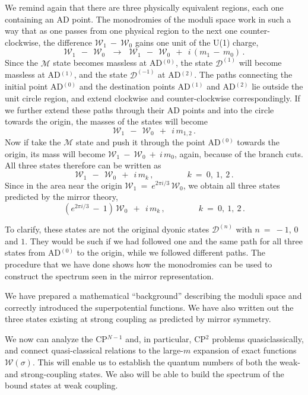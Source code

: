 \documentclass[epsfig,12pt]{article}
\def\beq{\begin{equation}}
\def\eeq{\end{equation}}
\def\beq{\begin{equation}}
\def\eeq{\end{equation}}
\newcommand{\W}{\mathcal{W}}
\newcommand{\M}{\mathcal{M}}
\newcommand{\D}{\mathcal{D}}
\begin{document}
	We remind again that there are three physically equivalent regions, each one containing an AD point.
	The monodromies of the moduli space work in such a way that as one passes from 
	one physical region to the next one counter-clockwise, the difference 
$ \W_1 ~-~ \W_0 $
	gains one unit of the U(1) charge,
\beq
	\W_1 ~~-~~ \W_0  ~~~\to~~~ \W_1 ~~-~~ \W_0 ~~+~~ i\,( m_1 \,-\, m_0 ) \,.
\eeq
	Since the $ \M $ state becomes massless at AD$^{(0)}$, the state $ \D^{(1)} $ will become
	massless at AD$^{(1)}$, and the state $ \D^{(-1)} $ at AD$^{(2)}$.
	The paths connecting the initial point AD$^{(0)}$ and the destination points AD$^{(1)}$ and AD$^{(2)}$
	lie outside the unit circle region, and 
	extend clockwise and counter-clockwise correspondingly.
	If we further extend these paths through their AD points and into the circle towards the origin,
	the masses of the states will become
\beq
	\W_1 ~~-~~ \W_0 ~~+~~ i\, m_{1,2}\,.
\eeq
	Now if take the $ \M $ state and push it through the point AD$^{(0)}$ towards the origin,
	its mass will become $ \W_1 ~-~ \W_0 ~+~ i\,m_0 $, again, because of the branch cuts.
	All three states therefore can be written as
\beq
	\W_1 ~~-~~ \W_0 ~~+~~ i\, m_k\,,\qquad\qquad k~=~ 0,~1,~2\,.
\eeq
	Since in the area near the origin $ \W_1 ~=~ e^{2 \pi i / 3}\, \W_0 $, we obtain all three states 
	predicted by the mirror theory,
\beq
	(e^{2 \pi i /3} ~-~ 1)\, \W_0 ~~+~~ i\, m_k\,,\qquad\qquad k~=~ 0,~1,~2\,.
\eeq

	To clarify, these states are not the original dyonic states $ \D^{(n)} $ with $ n ~=~ -1 $,
	$ 0 $ and $ 1 $.
	They would be such if we had followed one and the same path for all three states from AD$^{(0)}$ to
	the origin, while we followed different paths.
	The procedure that we have done shows how the monodromies can be used to construct the spectrum
	seen in the mirror representation.

	We have prepared a mathematical ``background'' describing the moduli space and 
	correctly introduced the superpotential functions.
	We have also written out the three states existing at strong coupling as predicted by mirror symmetry.
	
	We now can analyze the CP$^{N-1}$ and, in particular, CP$^2$ problems quasiclassically, and 
	connect quasi-classical relations to the large-$ m $ expansion of exact functions $ \W(\sigma) $.
	This will enable us to establish the quantum numbers of both the weak- and strong-coupling states.
	We also will be able to build the spectrum of the bound states at weak coupling.
\end{document}
